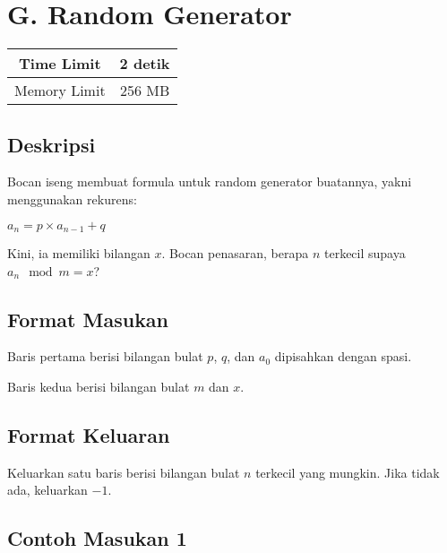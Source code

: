 \documentclass{article}
\begin{document}
\section*{\hfil G. Random Generator\hfil}

\begin{center}
\begin{tabular}{ |cc| } 
 \hline
 Time Limit & 2 detik \\
 \hline 
 Memory Limit & 256 MB \\
 \hline
\end{tabular}
\end{center}

\subsection*{Deskripsi}

\par\noindent Bocan iseng membuat formula untuk random generator buatannya, yakni menggunakan rekurens:

\begin{center}
$a_n = p \times a_{n-1} + q$
\end{center}

\par\noindent Kini, ia memiliki bilangan $x$. Bocan penasaran, berapa $n$ terkecil supaya $a_n \mod m = x$?

\subsection*{Format Masukan}

\par\noindent Baris pertama berisi bilangan bulat $p$, $q$, dan $a_0$ dipisahkan dengan spasi.
\par\noindent Baris kedua berisi bilangan bulat $m$ dan $x$.

\subsection*{Format Keluaran}

\par\noindent Keluarkan satu baris berisi bilangan bulat $n$ terkecil yang mungkin. Jika tidak ada, keluarkan $-1$.

\subsection*{Contoh Masukan 1}
\end{document}
